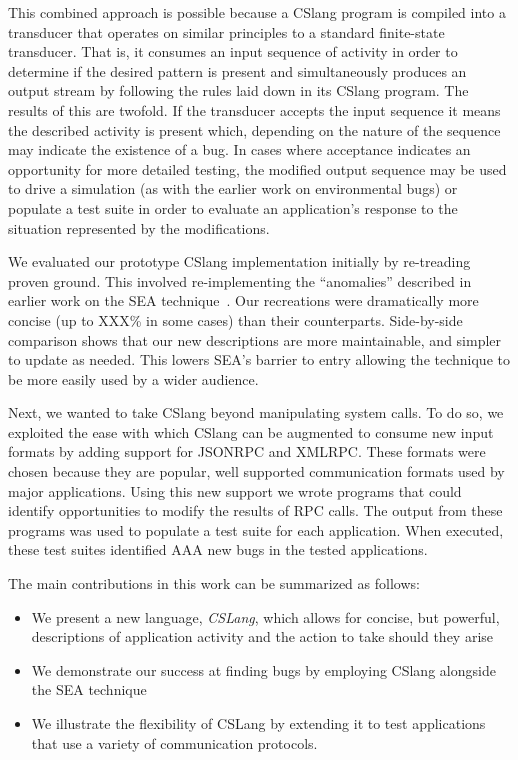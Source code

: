 This combined approach is possible
because a CSlang program
is compiled into a transducer
that operates on similar principles
to a standard finite-state transducer.
That is,
it consumes an input sequence of activity
in order to determine if the desired pattern is present
and simultaneously produces an output stream by
following the rules laid down in its CSlang program.
The results of this are twofold.
If the transducer accepts the input sequence
it means the described activity is present which,
depending on the nature of the sequence
may indicate the existence of a bug.
In cases where acceptance indicates an opportunity
for more detailed testing,
the modified output sequence may be used
to drive a simulation (as with the earlier work on environmental bugs) or populate
a test suite in order to evaluate an application's response
to the situation represented by the modifications.

We evaluated our prototype CSlang implementation initially by 
re-treading proven ground.
This involved re-implementing the ``anomalies''  
described in earlier work on the SEA technique~\cite{crashsim}.
Our recreations were dramatically more concise (up to XXX\% in some cases)
than their counterparts.  Side-by-side comparison shows that our new
descriptions are
more maintainable,
and simpler to update as needed.
This lowers SEA's barrier to entry allowing the
technique to be more easily used by a wider audience.

Next, we wanted to take CSlang beyond manipulating system calls.
To do so, 
we exploited the ease with which
CSlang can be augmented
to consume new input formats
by adding support for JSONRPC and XMLRPC.
These formats were chosen
because they are popular,
well supported communication formats
used by major applications.
Using this new support
we wrote programs
that could identify opportunities
to modify the results of RPC calls.
The output from these programs was used to populate a test suite
for each application.
When executed, these test suites identified AAA new bugs in the tested applications.

The main contributions in this work can be summarized as follows:

\begin{itemize}

\item{We present a new language, {\em CSLang},
  which allows for concise, but powerful, descriptions of
    application activity and the action to take should they arise}

\item{We demonstrate our success at finding bugs by employing CSlang
  alongside the SEA technique}

\item{We illustrate the flexibility of CSLang by extending it to test applications
that use a variety of communication protocols. }

\end{itemize}

